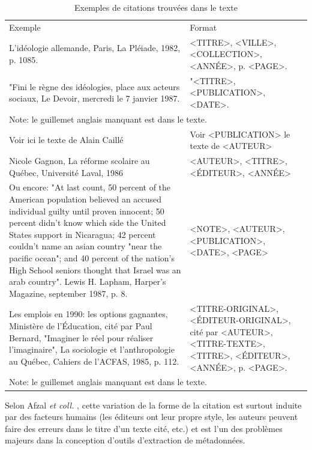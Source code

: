 \fontsize{3.5mm}{4.5mm}\selectfont
\begin{table}
\begin{tabular}{| p{8cm} | p{8cm} | }
    \hline
    \rowcolor[gray]{0.9}
    Exemple & Format \\
    L'idéologie allemande, Paris, La Pléiade, 1982, p. 1085. & <TITRE>, <VILLE>, <COLLECTION>, <ANNÉE>, p. <PAGE>. \\
    \hline
    "Fini le règne des idéologies, place aux acteurs sociaux, Le Devoir, mercredi le 7 janvier 1987. & "<TITRE>, <PUBLICATION>, <DATE>. \\
    \hline
    \multicolumn{2}{|l|}{Note: le guillemet anglais manquant est dans le texte.} \\ 
    \hline
    Voir ici le texte de Alain Caillé & Voir <PUBLICATION> le texte de <AUTEUR> \\
    \hline
    Nicole Gagnon, La réforme scolaire au Québec, Université Laval, 1986 & <AUTEUR>, <TITRE>, <ÉDITEUR>, <ANNÉE> \\
    \hline
    Ou encore: "At last count, 50 percent of the American population believed an accused individual guilty until proven innocent; 50 percent didn't know which side the United States support in Nicaragua; 42 percent couldn't name an asian country "near the pacific ocean"; and 40 percent of the nation's High School seniors thought that Israel was an arab country". Lewis H. Lapham, Harper's Magazine, september 1987, p. 8. & <NOTE>, <AUTEUR>, <PUBLICATION>, <DATE>, <PAGE> \\
    \hline
    Les emplois en 1990: les options gagnantes, Ministère de l'Éducation, cité par Paul Bernard, "Imaginer le réel pour réaliser l'imaginaire", La sociologie et l'anthropologie au Québec, Cahiers de l'ACFAS, 1985, p. 112. & <TITRE-ORIGINAL>, <ÉDITEUR-ORIGINAL>, cité par <AUTEUR>, <TITRE-TEXTE>, <TITRE>, <ÉDITEUR>, <ANNÉE>, p. <PAGE>. \\
    \hline
    \multicolumn{2}{|l|}{Note: le guillemet anglais manquant est dans le texte.} \\ 
    \hline
\end{tabular}

\caption{Exemples de citations trouvées dans le texte}
\label{f4}
\end{table}
\fontsize{4.5mm}{6.5mm}\selectfont
Selon Afzal \emph{et coll.} \cite{afzal2009improving}, cette variation de la forme de la citation est surtout induite par des facteurs humains (les éditeurs ont leur propre style, les auteurs peuvent faire des erreurs dans le titre d'un texte cité, etc.) et est l'un des problèmes majeurs dans la conception d'outils d'extraction de métadonnées.

